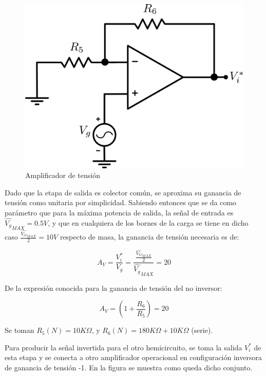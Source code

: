\begin{figure}[!ht]
\begin{centering}
\includegraphics[scale=0.5]{Imagenes/EtapaDeAV.png}
\par\end{centering}
\caption{Amplificador de tensión}
\end{figure}

Dado que la etapa de salida es colector común, se aproxima su ganancia de tensión como unitaria por simplicidad. Sabiendo entonces que se da como parámetro que para la máxima potencia de salida, la señal de entrada es $\hat{V_g}_{MAX} = 0.5V$, y que en cualquiera de los bornes de la carga se tiene en dicho caso $\frac{\hat{V_O}_{MAX}}{2} = 10V$ respecto de masa, la ganancia de tensión necesaria es de:

\[
A_V = \frac{V_i^*}{V_g} = \frac{ \frac{\hat{V_O}_{MAX}}{2} }{\hat{V_g}_{MAX}} = 20
\]

De la expresión conocida para la ganancia de tensión del no inversor:

\[
A_V = \left( 1 + \frac{R_6}{R_5} \right) = 20
\]

Se toman $R_5(N) = 10K\Omega$, y $R_6(N) = 180K\Omega + 10K\Omega$ (serie).

Para producir la señal invertida para el otro hemicircuito, se toma la salida $V_i^*$ de esta etapa y se conecta a otro amplificador operacional en configuración inversora de ganancia de tensión -1. En la figura se muestra como queda dicho conjunto.

